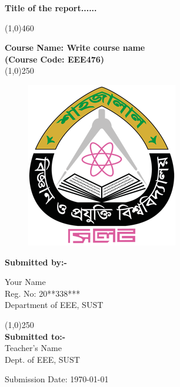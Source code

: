\begin{titlepage}
	\begin{center}
	 \begin{Large}
	 \textbf{Title of the report......}
	 \end{Large}
	 \line(1,0){460}\\[5mm]
	 \begin{large} \textbf{ Course Name: Write course name\\
	 (Course Code: EEE476)}\\
	 	\line(1,0){250}
	 	\\[10mm]
	 \end{large}
	\end{center}
	

\begin{figure}[h]
\begin{center}
\includegraphics[scale=2.5]{logo/SUST_Logo.png}
\end{center}
\end{figure}

	\begin{center}
	\begin{large}
	
	\textbf{Submitted by:-}\\
\begin{center}
	 Your Name\\
	 Reg. No: 20**338***\\
	 Department of EEE, SUST\\
	[.3in]
\end{center}
	
	
	
	\line(1,0){250}
	\\[.5cm]
	\textbf{Submitted to:-}\\
	Teacher's Name\\
	Dept. of EEE, SUST\\
	\end{large}
	\end{center}
	
	\vfill
	\begin{center}
	Submission Date: \today
	\end{center}
\end{titlepage}

\restoregeometry


